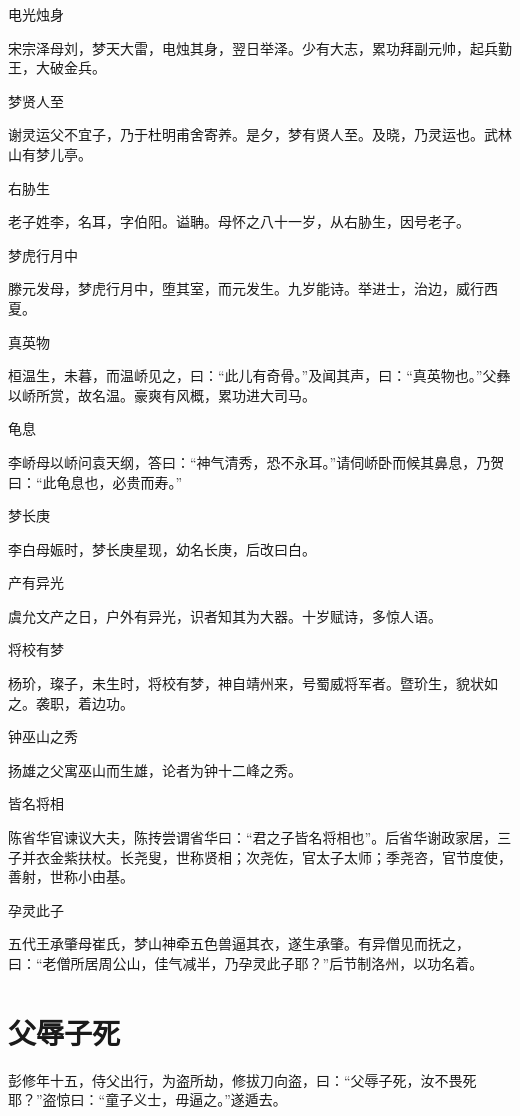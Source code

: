 \documentclass[a4paper,12pt,UTF8,twoside]{ctexbook}
\begin{document}
    电光烛身
    
    宋宗泽母刘，梦天大雷，电烛其身，翌日举泽。少有大志，累功拜副元帅，起兵勤王，大破金兵。
    
    梦贤人至
    
    谢灵运父不宜子，乃于杜明甫舍寄养。是夕，梦有贤人至。及晓，乃灵运也。武林山有梦儿亭。
    
    右胁生
    
    老子姓李，名耳，字伯阳。谥聃。母怀之八十一岁，从右胁生，因号老子。
    
    梦虎行月中
    
    滕元发母，梦虎行月中，堕其室，而元发生。九岁能诗。举进士，治边，威行西夏。
    
    真英物
    
    桓温生，未暮，而温峤见之，曰：“此儿有奇骨。”及闻其声，曰：“真英物也。”父彝以峤所赏，故名温。豪爽有风概，累功进大司马。
    
    龟息
    
    李峤母以峤问袁天纲，答曰：“神气清秀，恐不永耳。”请伺峤卧而候其鼻息，乃贺曰：“此龟息也，必贵而寿。”
    
    梦长庚
    
    李白母娠时，梦长庚星现，幼名长庚，后改曰白。
    
    产有异光
    
    虞允文产之日，户外有异光，识者知其为大器。十岁赋诗，多惊人语。
    
    将校有梦
    
    杨玠，璨子，未生时，将校有梦，神自靖州来，号蜀威将军者。暨玠生，貌状如之。袭职，着边功。
    
    钟巫山之秀
    
    扬雄之父寓巫山而生雄，论者为钟十二峰之秀。
    
    皆名将相
    
    陈省华官谏议大夫，陈抟尝谓省华曰：“君之子皆名将相也”。后省华谢政家居，三子并衣金紫扶杖。长尧叟，世称贤相；次尧佐，官太子太师；季尧咨，官节度使，善射，世称小由基。
    
    孕灵此子
    
    五代王承肇母崔氏，梦山神牵五色兽逼其衣，遂生承肇。有异僧见而抚之，曰：“老僧所居周公山，佳气减半，乃孕灵此子耶？”后节制洛州，以功名着。
    
    \section{父辱子死}
    
    彭修年十五，侍父出行，为盗所劫，修拔刀向盗，曰：“父辱子死，汝不畏死耶？”盗惊曰：“童子义士，毋逼之。”遂遁去。
    
\end{document}
